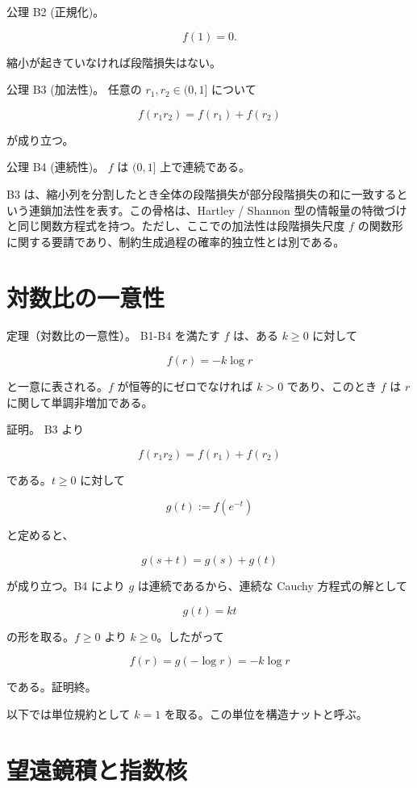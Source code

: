 \documentclass[12pt,a4paper]{article}
\begin{document}
公理 B2 (正規化)。

\[
f(1)=0.
\]

縮小が起きていなければ段階損失はない。

公理 B3 (加法性)。 任意の \(r_1,r_2\in(0,1]\) について

\[
f(r_1r_2)=f(r_1)+f(r_2)
\]

が成り立つ。

公理 B4 (連続性)。 \(f\) は \((0,1]\) 上で連続である。

B3 は、縮小列を分割したとき全体の段階損失が部分段階損失の和に一致するという連鎖加法性を表す。この骨格は、Hartley / Shannon 型の情報量の特徴づけと同じ関数方程式を持つ。ただし、ここでの加法性は段階損失尺度 \(f\) の関数形に関する要請であり、制約生成過程の確率的独立性とは別である。

\section{対数比の一意性}\label{ux5bfeux6570ux6bd4ux306eux4e00ux610fux6027}

定理（対数比の一意性）。 B1-B4 を満たす \(f\) は、ある \(k\ge0\) に対して

\[
f(r)=-k\log r
\]

と一意に表される。\(f\) が恒等的にゼロでなければ \(k>0\) であり、このとき \(f\) は \(r\) に関して単調非増加である。

証明。 B3 より

\[
f(r_1r_2)=f(r_1)+f(r_2)
\]

である。\(t\ge0\) に対して

\[
g(t):=f(e^{-t})
\]

と定めると、

\[
g(s+t)=g(s)+g(t)
\]

が成り立つ。B4 により \(g\) は連続であるから、連続な Cauchy 方程式の解として

\[
g(t)=kt
\]

の形を取る。\(f\ge0\) より \(k\ge0\)。したがって

\[
f(r)=g(-\log r)=-k\log r
\]

である。証明終。

以下では単位規約として \(k=1\) を取る。この単位を構造ナットと呼ぶ。

\section{望遠鏡積と指数核}\label{ux671bux9060ux93e1ux7a4dux3068ux6307ux6570ux6838}
\end{document}
